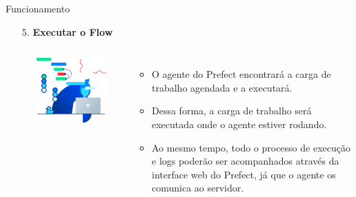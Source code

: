 \documentclass[t,serif]{beamer}
\begin{document}
	\begin{frame}{Funcionamento}
		\begin{enumerate}
			\item[5.] \textbf{Executar o Flow}
			\begin{columns}
					\\
					\begin{center}
						\includegraphics[width=\linewidth]{figs/2_5.png}
					\end{center}
					\\
					\begin{itemize}
						\item O agente do Prefect encontrará a carga de trabalho agendada e a executará.
						\item Dessa forma, a carga de trabalho será executada onde o agente estiver rodando.
						\item Ao mesmo tempo, todo o processo de execução e logs poderão ser acompanhados através da interface web do Prefect, já que o agente os comunica ao servidor.
					\end{itemize}
			\end{columns}
		\end{enumerate}
	\end{frame}
	
\end{document}
